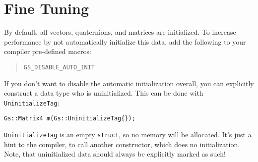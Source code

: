 \documentclass{article}
\begin{document}
\section*{Fine Tuning}

By default, all vectors, quaternions, and matrices are initialized. To increase performance by not automatically
initialize this data, add the following to your compiler pre-defined macros:
\begin{quote}
\texttt{GS\_DISABLE\_AUTO\_INIT}
\end{quote}
If you don't want to disable the automatic initialization overall, you can explicitly construct a data type
who is uninitialized. This can be done with \texttt{UninitializeTag}:
\begin{lstlisting}
Gs::Matrix4 m(Gs::UninitializeTag{});
\end{lstlisting}
\texttt{UninitializeTag} is an empty \texttt{struct}, so no memory will be allocated. It's just a hint to the compiler,
to call another constructor, which does no initialization.
Note, that uninitialized data should always be explicitly marked as such!
\end{document}
